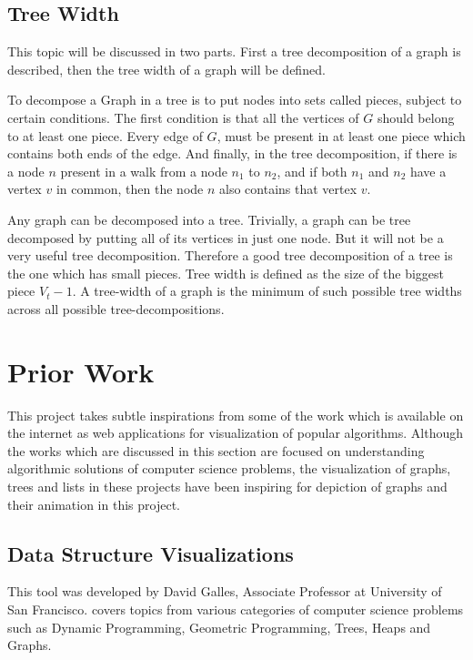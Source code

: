 \subsection{Tree Width}
\label{explanation: treewidth}
This topic will be discussed in two parts. First a tree decomposition of a
graph is described, then the tree width of a graph will be defined.

To decompose a Graph in a tree is to put nodes into sets called pieces, subject
to certain conditions.  The first condition is that all the vertices of $G$
should belong to at least one piece. Every edge of $G$, must be present in
at least one piece which contains both ends of the edge.  And finally, in the
tree decomposition, if there is a node $n$ present in a walk from a node $n_1$
to $n_2$, and if both $n_1$ and $n_2$ have a vertex $v$ in common, then the node
$n$ also contains that vertex $v$. 

Any graph can be decomposed into a tree. Trivially, a graph can be tree
decomposed by putting all of its vertices in just one node. But it will not be
a very useful tree decomposition.  Therefore a good tree decomposition of a
tree is the one which has small pieces.  Tree width is defined as the size of
the biggest piece $V_t - 1$. A tree-width of a graph is the minimum of such
possible tree widths across all possible tree-decompositions. \cite{KleinbergTardos06}

\section{Prior Work}
This project takes subtle inspirations from some of the work which is available
on the internet as web applications for visualization of popular algorithms.
Although the works which are discussed in this section are focused on
understanding algorithmic solutions of computer science problems, the
visualization of graphs, trees and lists in these projects have been inspiring
for depiction of graphs and their animation in this project.

\subsection{Data Structure Visualizations}
\label{priorWork: datastrucvisu}
This tool was developed by David Galles, Associate Professor at University of San
Francisco. \cite{Galles} covers topics
from various categories of computer science problems such as Dynamic
Programming, Geometric Programming, Trees, Heaps and Graphs.

